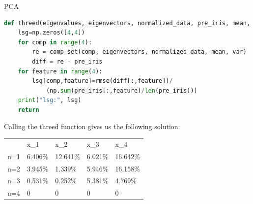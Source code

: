 \begin{task}[]{PCA}
\begin{subtask}
\begin{lstlisting}[language=python]
def threed(eigenvalues, eigenvectors, normalized_data, pre_iris, mean, var):
	lsg=np.zeros([4,4])
	for comp in range(4):
		re = comp_set(comp, eigenvectors, normalized_data, mean, var)
		diff = re - pre_iris
	for feature in range(4):
		lsg[comp,feature]=rmse(diff[:,feature])/
			(np.sum(pre_iris[:,feature]/len(pre_iris)))
	print("lsg:", lsg)
	return 
\end{lstlisting}
Calling the threed function gives us the following solution:
\begin{table}[H]
	\begin{tabular}{lllll}
		& x\_1    & x\_2     & x\_3    & x\_4     \\
		n=1 & 6.406\% & 12.641\% & 6.021\% & 16.642\% \\
		n=2 & 3.945\% & 1.339\%  & 5.946\% & 16.158\% \\
		n=3 & 0.531\% & 0.252\%  & 5.381\% & 4.769\%  \\
		n=4 & 0       & 0        & 0       & 0       
	\end{tabular}
\end{table}
\end{subtask}
\end{task}


